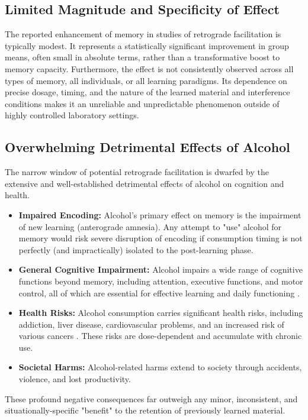 \documentclass[12pt, a4paper]{article}
\begin{document}
\subsection{Limited Magnitude and Specificity of Effect}
The reported enhancement of memory in studies of retrograde facilitation is typically modest. It represents a statistically significant improvement in group means, often small in absolute terms, rather than a transformative boost to memory capacity. Furthermore, the effect is not consistently observed across all types of memory, all individuals, or all learning paradigms. Its dependence on precise dosage, timing, and the nature of the learned material and interference conditions makes it an unreliable and unpredictable phenomenon outside of highly controlled laboratory settings.

\subsection{Overwhelming Detrimental Effects of Alcohol}
The narrow window of potential retrograde facilitation is dwarfed by the extensive and well-established detrimental effects of alcohol on cognition and health.
\begin{itemize}
    \item \textbf{Impaired Encoding:} Alcohol's primary effect on memory is the impairment of new learning (anterograde amnesia). Any attempt to "use" alcohol for memory would risk severe disruption of encoding if consumption timing is not perfectly (and impractically) isolated to the post-learning phase.
    \item \textbf{General Cognitive Impairment:} Alcohol impairs a wide range of cognitive functions beyond memory, including attention, executive functions, and motor control, all of which are essential for effective learning and daily functioning \cite{Moss2007}.
    \item \textbf{Health Risks:} Alcohol consumption carries significant health risks, including addiction, liver disease, cardiovascular problems, and an increased risk of various cancers \cite{Rehm2009}. These risks are dose-dependent and accumulate with chronic use.
    \item \textbf{Societal Harms:} Alcohol-related harms extend to society through accidents, violence, and lost productivity.
\end{itemize}
These profound negative consequences far outweigh any minor, inconsistent, and situationally-specific "benefit" to the retention of previously learned material.
\end{document}
